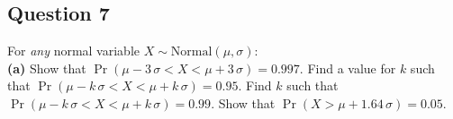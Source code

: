 \documentclass[]{article}
\begin{document}
\subsection*{Question 7}
For \emph{any} normal variable $X \sim \text{Normal}(\mu,\sigma)$:\\[-0.2cm]

{\bf(a)} Show that $\Pr(\mu-3\,\sigma<X<\mu+3\,\sigma) = 0.997$.  Find a value for $k$ such that $\Pr(\mu-k\,\sigma<X<\mu+k\,\sigma) = 0.95$.  Find $k$ such that $\Pr(\mu-k\,\sigma<X<\mu+k\,\sigma) = 0.99$.  Show that $\Pr(X>\mu+1.64\,\sigma) = 0.05.$
\end{document}
